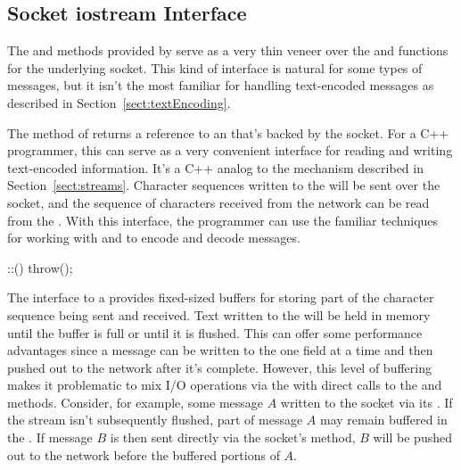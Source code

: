 \subsection{Socket iostream Interface}

The  and  methods provided by
 serve as a very thin veneer over the
 and  functions for the underlying
socket.  This kind of interface is natural for some types of messages,
but it isn't the most familiar for handling text-encoded messages
as described in Section~\ref{sect:textEncoding}.  

The  method of  returns
a reference to an  that's backed by the socket.  For a
C++ programmer, this can serve as a very convenient interface for
reading and writing text-encoded information.  It's a C++ analog to
the  mechanism described in
Section~\ref{sect:streams}.  Character sequences written to the
 will be sent over the socket, and the sequence of
characters received from the network can be read from the
.  With this interface, the programmer can use the
familiar techniques for working with  and 
to encode and decode messages.

\begin{inlinefcn}
::()
throw();
\end{inlinefcn}

The  interface to a  provides
fixed-sized buffers for storing part of the character sequence being
sent and received.  Text written to the  will be held
in memory until the buffer is full or until it is flushed.  This can
offer some performance advantages since a message can be written to
the  one field at a time and then pushed out to the
network after it's complete.  However, this level of buffering makes
it problematic to mix I/O operations via the  with
direct calls to the  and  methods.
Consider, for example, some message $A$ written to the socket via
its .  If the stream isn't subsequently flushed, part
of message $A$ may remain buffered in the .  If message
$B$ is then sent directly via the socket's  method, $B$
will be pushed out to the network before the buffered portions of $A$.


